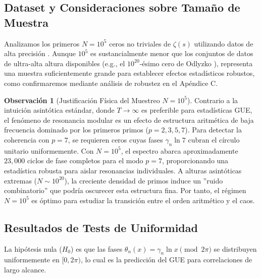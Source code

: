 \documentclass[12pt, a4paper]{article}
\theoremstyle{plain}
\theoremstyle{definition}
\newtheorem{observacion}[teorema]{Observación}
\begin{document}
\subsection{Dataset y Consideraciones sobre Tamaño de Muestra}

Analizamos los primeros $N=10^5$ ceros no triviales de $\zeta(s)$ utilizando datos de alta precisión \cite{gourdon2004, odlyzko2001}. Aunque $10^5$ es sustancialmente menor que los conjuntos de datos de ultra-alta altura disponibles (e.g., el $10^{20}$-ésimo cero de Odlyzko \cite{odlyzko2001}), representa una muestra suficientemente grande para establecer efectos estadísticos robustos, como confirmaremos mediante análisis de robustez en el Apéndice C.

\begin{observacion}[Justificación Física del Muestreo $N=10^5$]
Contrario a la intuición asintótica estándar, donde $T \to \infty$ es preferible para estadísticas GUE, el fenómeno de resonancia modular es un efecto de estructura aritmética de baja frecuencia dominado por los primeros primos ($p=2, 3, 5, 7$). Para detectar la coherencia con $p=7$, se requieren ceros cuyas fases $\gamma_n \ln 7$ cubran el círculo unitario uniformemente. Con $N=10^5$, el espectro abarca aproximadamente $23,000$ ciclos de fase completos para el modo $p=7$, proporcionando una estadística robusta para aislar resonancias individuales. A alturas asintóticas extremas ($N \sim 10^{20}$), la creciente densidad de primos induce un ''ruido combinatorio'' que podría oscurecer esta estructura fina. Por tanto, el régimen $N=10^5$ es óptimo para estudiar la transición entre el orden aritmético y el caos.
\end{observacion}

\subsection{Resultados de Tests de Uniformidad}

La hipótesis nula ($H_0$) es que las fases $\theta_n(x) = \gamma_n \ln x \pmod{2\pi}$ se distribuyen uniformemente en $[0, 2\pi)$, lo cual es la predicción del GUE para correlaciones de largo alcance.
\end{document}
